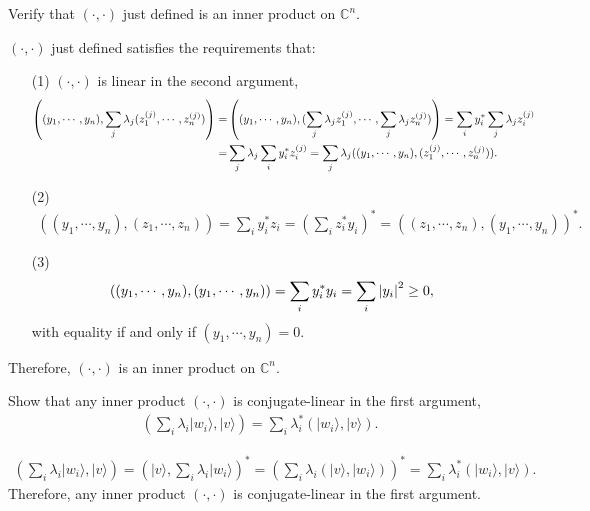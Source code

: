 \documentclass[en]{sol-man}
\begin{document}
\begin{exe}
    Verify that $(\cdot,\cdot)$ just defined is an inner product on $\mathbb{C}^n$.
\end{exe}
\begin{pf}
    $(\cdot,\cdot)$ just defined satisfies the requirements that:
    \begin{itemize}
        \item[(1)] $(\cdot,\cdot)$ is linear in the second argument,
        \begin{align}
            \notag\left((y_1,\cdots,y_n),\sum_j\lambda_j(z_1^{(j)},\cdots,z_n^{(j)})\right)=&\left((y_1,\cdots,y_n),(\sum_j\lambda_jz_1^{(j)},\cdots,\sum_j\lambda_jz_n^{(j)})\right)=\sum_iy_i^*\sum_j\lambda_jz_i^{(j)}\\
            =&\sum_j\lambda_j\sum_iy_i^*z_i^{(j)}=\sum_j\lambda_j((y_1,\cdots,y_n),(z_1^{(j)},\cdots,z_n^{(j)})).
        \end{align}
        \item[(2)] 
        \begin{align}
            ((y_1,\cdots,y_n),(z_1,\cdots,z_n))=\sum_iy_i^*z_i=\left(\sum_iz_i^*y_i\right)^*=((z_1,\cdots,z_n),(y_1,\cdots,y_n))^*.
        \end{align}
        \item[(3)] 
        \begin{align}
            ((y_1,\cdots,y_n),(y_1,\cdots,y_n))=\sum_iy_i^*y_i=\sum_i\left\lvert y_i\right\rvert^2\geq 0,
        \end{align}
        with equality if and only if $(y_1,\cdots,y_n)=0$.
    \end{itemize}
    Therefore, $(\cdot,\cdot)$ is an inner product on $\mathbb{C}^n$.
\end{pf}

\begin{exe}
    Show that any inner product $(\cdot,\cdot)$ is conjugate-linear in the first argument,
    \begin{align}
        \left(\sum_i\lambda_i\lvert w_i\rangle,\lvert v\rangle\right)=\sum_i\lambda_i^*(\lvert w_i\rangle,\lvert v\rangle).
    \end{align}
\end{exe}
\begin{pf}
    \begin{align}
        \left(\sum_i\lambda_i\lvert w_i\rangle,\lvert v\rangle\right)=\left(\lvert v\rangle,\sum_i\lambda_i\lvert w_i\rangle\right)^*=\left(\sum_i\lambda_i(\lvert v\rangle,\lvert w_i\rangle)\right)^*=\sum_i\lambda_i^*(\lvert w_i\rangle,\lvert v\rangle).
    \end{align}
    Therefore, any inner product $(\cdot,\cdot)$ is conjugate-linear in the first argument.
\end{pf}
\end{document}
